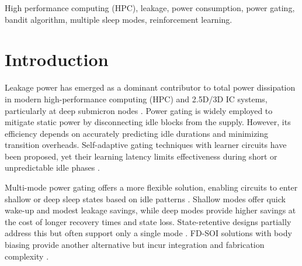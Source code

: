 \documentclass[conference]{IEEEtran}
\begin{document}
\begin{abstract}
In deep submicron nodes, leakage power is a critical concern, especially in high-performance computing (HPC) and advanced 2.5D/3D integration, where traditional power gating techniques struggle with adaptability and responsivness. This paper proposes a novel multi-mode, state-retentive power gating architecture integrated with an online bandit learning algorithm for real-time sleep mode selection under workload-driven idle patterns. Unlike heuristic or pre-learned strategies, the proposed multi-armed bandit (MAB) controller adapts on-the-fly to stochastic idle distributions caused by dynamic memory access patterns and decentralized dynamic voltage and frequency scaling DVFS operations. Implemented in 65 nm CMOS technology node and validated in Cadence Virtuoso on SRAM logic, the design demonstrates leakage reductions of 92.5\%–98\% across modes. The adaptive MAB controller further achieves up to 71.7\% energy savings compared to state-of-the-art (SOTA) approaches. The approach is robust across process, voltage, and temperature (PVT) corners and provides a lightweight, scalable solution tailored for idle-prone HPC workloads.


\end{abstract}
\begin{IEEEkeywords}
High performance computing (HPC), leakage, power consumption, power gating, bandit algorithm, multiple sleep modes, reinforcement learning.
\end{IEEEkeywords}

\section{Introduction}
Leakage power has emerged as a dominant contributor to total power dissipation in modern high-performance computing (HPC) and 2.5D/3D IC systems, particularly at deep submicron nodes \cite{ECTCSal,ECTC}. Power gating is widely employed to mitigate static power by disconnecting idle blocks from the supply. However, its efficiency depends on accurately predicting idle durations and minimizing transition overheads. Self-adaptive gating techniques with learner circuits have been proposed, yet their learning latency limits effectiveness during short or unpredictable idle phases \cite{6807809}.

Multi-mode power gating offers a more flexible solution, enabling circuits to enter shallow or deep sleep states based on idle patterns \cite{1613208}. Shallow modes offer quick wake-up and modest leakage savings, while deep modes provide higher savings at the cost of longer recovery times and state loss. State-retentive designs partially address this but often support only a single mode \cite{patent}. FD-SOI solutions with body biasing provide another alternative but incur integration and fabrication complexity \cite{7593216}.
\end{document}
